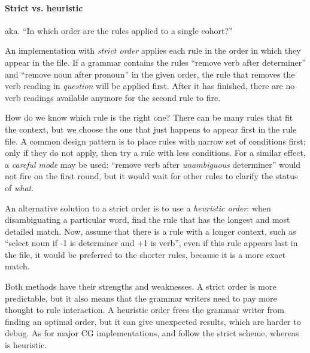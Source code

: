 {\paragraph{Strict vs. heuristic}

aka. ``In which order are the rules applied to a single cohort?''

An implementation with \emph{strict order} applies each rule in the order in 
which they appear in the file. If a grammar contains the rules ``remove verb after determiner'' and ``remove noun after pronoun'' in the given order, the rule that removes the verb reading in \emph{question} will be applied first. After it has finished, there are no verb readings available anymore for the second rule to fire.
					
How do we know which rule is the right one? There can be many rules that fit the context, but we choose the one that just happens to appear first in the rule file. 
A common design pattern is to place rules with narrow set of conditions first; 
only if they do not apply, then try a rule with less conditions. For a similar effect,
a \emph{careful mode} may be used: ``remove verb after \emph{unambiguous} determiner'' 
would not fire on the first round, but it would wait for other rules to clarify the
status of \emph{what}.


					
An alternative solution to a strict order is to use a \emph{heuristic order}: when disambiguating a particular word, find the rule that has the longest and most detailed match. Now, assume that there is a rule with a longer context, such as ``select noun if -1 is determiner and +1 is verb'', even if this rule appears last in the file, it would be preferred to the shorter rules, because it is a more exact match.
					
Both methods have their strengths and weaknesses. A strict order is more predictable, but it also means that the grammar writers need to pay more thought to rule interaction. A heuristic order frees the grammar writer from finding an optimal order, but it can give unexpected results, which are harder to debug.
As for major CG implementations, \cite{karlsson1990cgp} and \cite{vislcg3} follow the strict scheme, whereas \cite{tapanainen1996} is heuristic.


}
